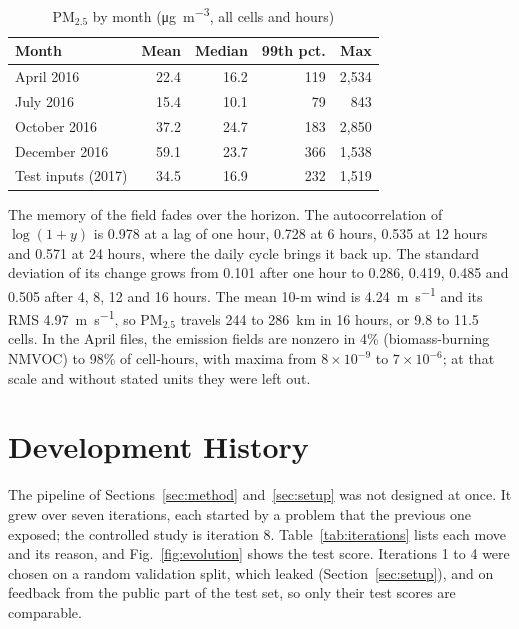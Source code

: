 \documentclass[journal]{IEEEtran}
\newcommand{\ugm}{\si{\micro\gram\per\cubic\metre}}
\newcommand{\PM}{PM$_{2.5}$}
\begin{document}
\begin{table}[H]
\centering
\caption{\PM{} by month (\ugm, all cells and hours)}
\label{tab:monthstats}
\begin{tabular}{@{}lrrrr@{}}
\toprule
Month & Mean & Median & 99th pct. & Max \\
\midrule
April 2016 & 22.4 & 16.2 & 119 & 2{,}534 \\
July 2016 & 15.4 & 10.1 & 79 & 843 \\
October 2016 & 37.2 & 24.7 & 183 & 2{,}850 \\
December 2016 & 59.1 & 23.7 & 366 & 1{,}538 \\
Test inputs (2017) & 34.5 & 16.9 & 232 & 1{,}519 \\
\bottomrule
\end{tabular}
\end{table}

The memory of the field fades over the horizon. The autocorrelation of $\log(1+y)$ is 0.978 at a lag of one hour, 0.728 at 6 hours, 0.535 at 12 hours and 0.571 at 24 hours, where the daily cycle brings it back up. The standard deviation of its change grows from 0.101 after one hour to 0.286, 0.419, 0.485 and 0.505 after 4, 8, 12 and 16 hours. The mean 10-m wind is 4.24~\si{\metre\per\second} and its RMS 4.97~\si{\metre\per\second}, so \PM{} travels 244 to 286~km in 16 hours, or 9.8 to 11.5 cells. In the April files, the emission fields are nonzero in 4\% (biomass-burning NMVOC) to 98\% of cell-hours, with maxima from $8\times10^{-9}$ to $7\times10^{-6}$; at that scale and without stated units they were left out.

\section{Development History}
\label{sec:history}
The pipeline of Sections~\ref{sec:method} and~\ref{sec:setup} was not designed at once. It grew over seven iterations, each started by a problem that the previous one exposed; the controlled study is iteration 8. Table~\ref{tab:iterations} lists each move and its reason, and Fig.~\ref{fig:evolution} shows the test score. Iterations 1 to 4 were chosen on a random validation split, which leaked (Section~\ref{sec:setup}), and on feedback from the public part of the test set, so only their test scores are comparable.
\end{document}

